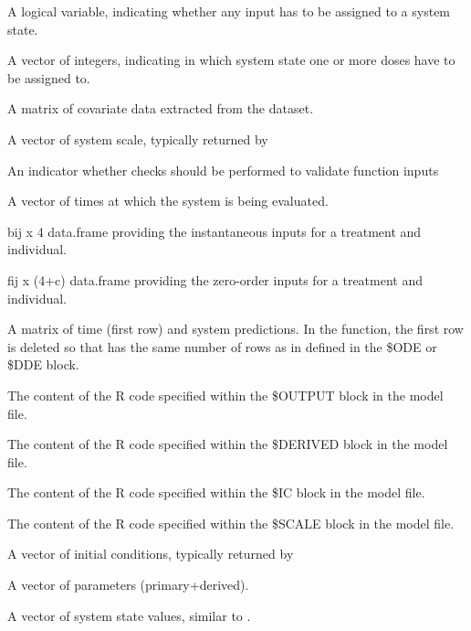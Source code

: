\begin{Arguments}
\begin{ldescription}
\item[\code{has.dosing}] A logical variable, indicating whether any input has to
be assigned to a system state.
\item[\code{dose.states}] A vector of integers, indicating in which system state one
or more doses have to be assigned to.
\item[\code{covdata}] A matrix of covariate data extracted from the dataset.
\item[\code{scale}] A vector of system scale, typically returned by 
\item[\code{check}] An indicator whether checks should be performed to validate 
function inputs
\item[\code{xdata}] A vector of times at which the system is being evaluated.
\item[\code{bolus}] bij x 4 data.frame providing the instantaneous inputs for a 
treatment and individual.
\item[\code{infusion}] fij x (4+c) data.frame providing the zero-order inputs for a
treatment and individual.
\item[\code{f}] A matrix of time (first row) and system predictions. In the 
 function, the first row is deleted so that  has
the same number of rows as in  defined in the \$ODE or \$DDE block.
\item[\code{codeoutput}] The content of the R code specified within the \$OUTPUT block 
in the model file.
\item[\code{codederiv}] The content of the R code specified within the \$DERIVED block 
in the model file.
\item[\code{codeic}] The content of the R code specified within the \$IC block in the 
model file.
\item[\code{codescale}] The content of the R code specified within the \$SCALE block 
in the model file.
\item[\code{ic}] A vector of initial conditions, typically returned by 
\item[\code{allparms}] A vector of parameters (primary+derived).
\item[\code{a}] A vector of system state values, similar to .
\end{ldescription}
\end{Arguments}
%
